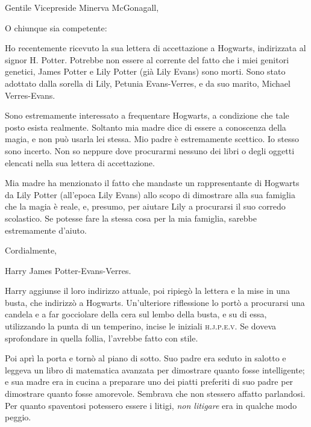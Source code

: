 \vspace{1em}
\begin{addmargin}[3em]{3em}%
\begin{itpars}
Gentile Vicepreside Minerva McGonagall,

O chiunque sia competente:

Ho recentemente ricevuto la sua lettera di accettazione a Hogwarts, indirizzata al signor H. Potter. Potrebbe non essere al corrente del fatto che i miei genitori genetici, James Potter e Lily Potter (già Lily Evans) sono morti. Sono stato adottato dalla sorella di Lily, Petunia Evans-Verres, e da suo marito, Michael Verres-Evans.

Sono estremamente interessato a frequentare Hogwarts, a condizione che tale posto esista realmente. Soltanto mia madre dice di essere a conoscenza della magia, e non può usarla lei stessa. Mio padre è estremamente scettico. Io stesso sono incerto. Non so neppure dove procurarmi nessuno dei libri o degli oggetti elencati nella sua lettera di accettazione.

Mia madre ha menzionato il fatto che mandaste un rappresentante di Hogwarts da Lily Potter (all’epoca Lily Evans) allo scopo di dimostrare alla sua famiglia che la magia è reale, e, presumo, per aiutare Lily a procurarsi il suo corredo scolastico. Se potesse fare la stessa cosa per la mia famiglia, sarebbe estremamente d’aiuto.

Cordialmente,

Harry James Potter-Evans-Verres.
\end{itpars}
\end{addmargin}
\vspace{1em}


Harry aggiunse il loro indirizzo attuale, poi ripiegò la lettera e la mise in una busta, che indirizzò a Hogwarts. Un’ulteriore riflessione lo portò a procurarsi una candela e a far gocciolare della cera sul lembo della busta, e su di essa, utilizzando la punta di un temperino, incise le iniziali \textsc{h.j.p.e.v.} Se doveva sprofondare in quella follia, l’avrebbe fatto con stile.

Poi aprì la porta e tornò al piano di sotto. Suo padre era seduto in salotto e leggeva un libro di matematica avanzata per dimostrare quanto fosse intelligente; e sua madre era in cucina a preparare uno dei piatti preferiti di suo padre per dimostrare quanto fosse amorevole. Sembrava che non stessero affatto parlandosi. Per quanto spaventosi potessero essere i litigi, \emph{non litigare} era in qualche modo peggio.

